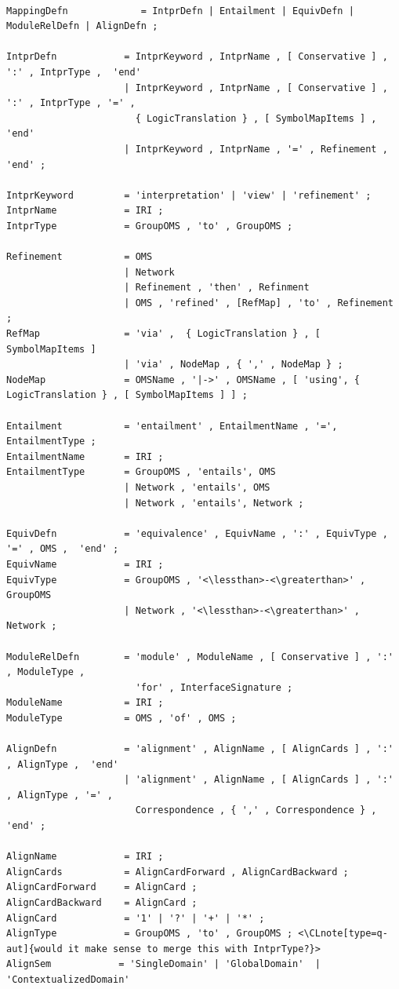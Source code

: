 \documentclass[10pt,%
\ifpretendfinal
final%
\else
draft%
\fi,
]{scrreprt}
\makeatletter
\newcommand*\CommentAuthor{}
\renewcommand*\CommentAuthor{#1}}
\newcommand*\CommentDate{}
\renewcommand*\CommentDate{#1}}
\newcommand*\CommentId{}
\renewcommand*\CommentId{#1}}
\newcommand*\CommentType{}
\renewcommand*\CommentType{#1}}
\newcommand*{\SetCommentColorByType}[1]{%
\edef\localType{{#1}}%
\expandafter\ifstrequal\localType{q-aut}{\colorlet{CommentColor}{red}}{%
\expandafter\ifstrequal\localType{q-all}{\colorlet{CommentColor}{orange}}{%
\expandafter\ifstrequal\localType{todo}{\colorlet{CommentColor}{orange}}{%
\expandafter\ifstrequal\localType{fyi}{\colorlet{CommentColor}{lightgray}}{%
\colorlet{CommentColor}{yellow}}}}}}
\newcommand*{\SetCommentPrefixByType}[1]{%
\edef\localType{{#1}}%
\expandafter\@ifmtarg\localType{%
\edef\CommentPrefix{}%
}{%
\caseupper[q]{#1}%
\edef\CommentPrefix{\thestring: }%
}}
\newcommand*{\initComment}[1]{%
\setkeys{Comment}{#1}%
\SetCommentColorByType{\CommentType}%
\relax%
\SetCommentPrefixByType{\CommentType}%
\relax%
}
\newcommand*{\todonote}[2][]{%
\initComment{#1}%
\pdfcomment[author=\CommentAuthor,color=CommentColor,date=\CommentDate,id=\CommentId]{%
\CommentPrefix
#2}}
\renewcommand*{\todonote}[2][]{%
\initComment{#1}%
\ednote{\CommentPrefix #2}}
\newcommand*{\CLnote}[2][author=Christoph Lange]{%
\todonote[author=Christoph Lange,#1]{#2} 
}
\makeatother
\begin{document}
\newcommand*{\lessthan}{<}
\newcommand*{\greaterthan}{>}
\begin{lstlisting}[language=ebnf,escapeinside={<>},mathescape]

MappingDefn             = IntprDefn | Entailment | EquivDefn | ModuleRelDefn | AlignDefn ;

IntprDefn            = IntprKeyword , IntprName , [ Conservative ] , ':' , IntprType ,  'end'
                     | IntprKeyword , IntprName , [ Conservative ] , ':' , IntprType , '=' ,
                       { LogicTranslation } , [ SymbolMapItems ] ,  'end' 
                     | IntprKeyword , IntprName , '=' , Refinement ,  'end' ;

IntprKeyword         = 'interpretation' | 'view' | 'refinement' ;
IntprName            = IRI ;
IntprType            = GroupOMS , 'to' , GroupOMS ;

Refinement           = OMS 
                     | Network
                     | Refinement , 'then' , Refinment
                     | OMS , 'refined' , [RefMap] , 'to' , Refinement ;
RefMap               = 'via' ,  { LogicTranslation } , [ SymbolMapItems ] 
                     | 'via' , NodeMap , { ',' , NodeMap } ;
NodeMap              = OMSName , '|->' , OMSName , [ 'using', { LogicTranslation } , [ SymbolMapItems ] ] ;

Entailment           = 'entailment' , EntailmentName , '=', EntailmentType ;
EntailmentName       = IRI ;
EntailmentType       = GroupOMS , 'entails', OMS
                     | Network , 'entails', OMS
                     | Network , 'entails', Network ;

EquivDefn            = 'equivalence' , EquivName , ':' , EquivType , '=' , OMS ,  'end' ;
EquivName            = IRI ;
EquivType            = GroupOMS , '<\lessthan>-<\greaterthan>' , GroupOMS 
                     | Network , '<\lessthan>-<\greaterthan>' , Network ;

ModuleRelDefn        = 'module' , ModuleName , [ Conservative ] , ':' , ModuleType ,
                       'for' , InterfaceSignature ;
ModuleName           = IRI ;
ModuleType           = OMS , 'of' , OMS ;

AlignDefn            = 'alignment' , AlignName , [ AlignCards ] , ':' , AlignType ,  'end'
                     | 'alignment' , AlignName , [ AlignCards ] , ':' , AlignType , '=' ,
                       Correspondence , { ',' , Correspondence } ,  'end' ;

AlignName            = IRI ;
AlignCards           = AlignCardForward , AlignCardBackward ;
AlignCardForward     = AlignCard ;
AlignCardBackward    = AlignCard ;
AlignCard            = '1' | '?' | '+' | '*' ;
AlignType            = GroupOMS , 'to' , GroupOMS ; <\CLnote[type=q-aut]{would it make sense to merge this with IntprType?}> 
AlignSem            = 'SingleDomain' | 'GlobalDomain'  | 'ContextualizedDomain' 


\end{lstlisting}
\end{document}
